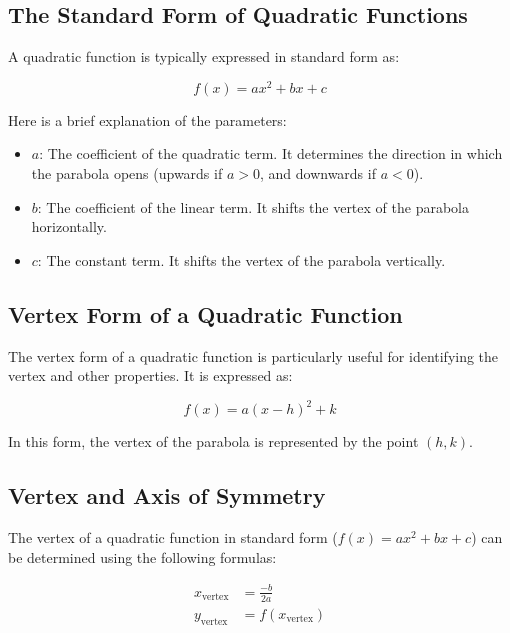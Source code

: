 \documentclass[12pt,a4paper]{article}
\begin{document}
\subsection{The Standard Form of Quadratic Functions}

A quadratic function is typically expressed in standard form as:

\begin{equation*}
f(x) = ax^2 + bx + c
\end{equation*}

Here is a brief explanation of the parameters:

\begin{itemize}
    \item $a$: The coefficient of the quadratic term. It determines the direction in which the parabola opens (upwards if $a > 0$, and downwards if $a < 0$).
    \item $b$: The coefficient of the linear term. It shifts the vertex of the parabola horizontally.
    \item $c$: The constant term. It shifts the vertex of the parabola vertically.
\end{itemize}

\subsection{Vertex Form of a Quadratic Function}

The vertex form of a quadratic function is particularly useful for identifying the vertex and other properties. It is expressed as:

\begin{equation}
f(x) = a(x - h)^2 + k
\end{equation}

In this form, the vertex of the parabola is represented by the point $(h, k)$.
\newpage
\subsection{Vertex and Axis of Symmetry}

The vertex of a quadratic function in standard form ($f(x) = ax^2 + bx + c$) can be determined using the following formulas:

\begin{align}
x_{\text{vertex}} &= \frac{-b}{2a} \\
y_{\text{vertex}} &= f(x_{\text{vertex}})
\end{align}
\end{document}
